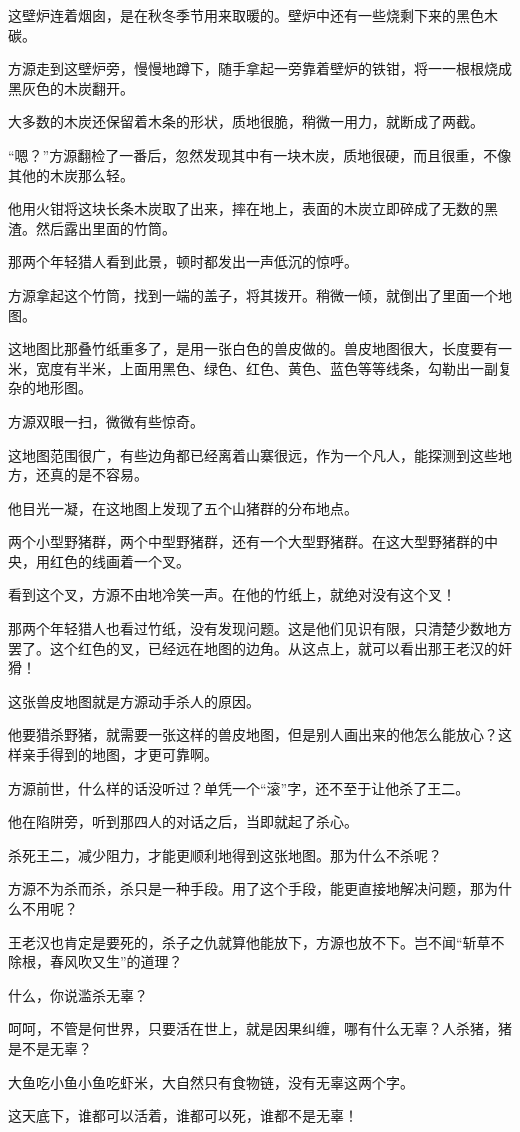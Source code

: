 \begin{this_body}
这壁炉连着烟囱，是在秋冬季节用来取暖的。壁炉中还有一些烧剩下来的黑色木碳。

方源走到这壁炉旁，慢慢地蹲下，随手拿起一旁靠着壁炉的铁钳，将一一根根烧成黑灰色的木炭翻开。

大多数的木炭还保留着木条的形状，质地很脆，稍微一用力，就断成了两截。

“嗯？”方源翻检了一番后，忽然发现其中有一块木炭，质地很硬，而且很重，不像其他的木炭那么轻。

他用火钳将这块长条木炭取了出来，摔在地上，表面的木炭立即碎成了无数的黑渣。然后露出里面的竹筒。

那两个年轻猎人看到此景，顿时都发出一声低沉的惊呼。

方源拿起这个竹筒，找到一端的盖子，将其拨开。稍微一倾，就倒出了里面一个地图。

这地图比那叠竹纸重多了，是用一张白色的兽皮做的。兽皮地图很大，长度要有一米，宽度有半米，上面用黑色、绿色、红色、黄色、蓝色等等线条，勾勒出一副复杂的地形图。

方源双眼一扫，微微有些惊奇。

这地图范围很广，有些边角都已经离着山寨很远，作为一个凡人，能探测到这些地方，还真的是不容易。

他目光一凝，在这地图上发现了五个山猪群的分布地点。

两个小型野猪群，两个中型野猪群，还有一个大型野猪群。在这大型野猪群的中央，用红色的线画着一个叉。

看到这个叉，方源不由地冷笑一声。在他的竹纸上，就绝对没有这个叉！

那两个年轻猎人也看过竹纸，没有发现问题。这是他们见识有限，只清楚少数地方罢了。这个红色的叉，已经远在地图的边角。从这点上，就可以看出那王老汉的奸猾！

这张兽皮地图就是方源动手杀人的原因。

他要猎杀野猪，就需要一张这样的兽皮地图，但是别人画出来的他怎么能放心？这样亲手得到的地图，才更可靠啊。

方源前世，什么样的话没听过？单凭一个“滚”字，还不至于让他杀了王二。

他在陷阱旁，听到那四人的对话之后，当即就起了杀心。

杀死王二，减少阻力，才能更顺利地得到这张地图。那为什么不杀呢？

方源不为杀而杀，杀只是一种手段。用了这个手段，能更直接地解决问题，那为什么不用呢？

王老汉也肯定是要死的，杀子之仇就算他能放下，方源也放不下。岂不闻“斩草不除根，春风吹又生”的道理？

什么，你说滥杀无辜？

呵呵，不管是何世界，只要活在世上，就是因果纠缠，哪有什么无辜？人杀猪，猪是不是无辜？

大鱼吃小鱼小鱼吃虾米，大自然只有食物链，没有无辜这两个字。

这天底下，谁都可以活着，谁都可以死，谁都不是无辜！

\end{this_body}

